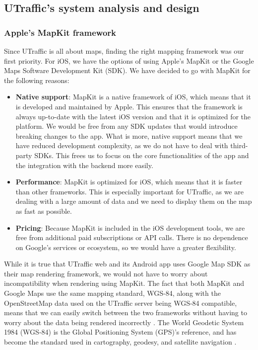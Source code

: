 \subsection{UTraffic's system analysis and design}

\subsubsection{Apple's MapKit framework}

Since UTraffic is all about maps, finding the right mapping framework was our first priority. For iOS, we have the options of using Apple's MapKit or the Google Maps Software Development Kit (SDK). We have decided to go with MapKit for the following reasons:

\begin{itemize}
    \item \textbf{Native support}: MapKit is a native framework of iOS, which means that it is developed and maintained by Apple. This ensures that the framework is always up-to-date with the latest iOS version and that it is optimized for the platform. We would be free from any SDK updates that would introduce breaking changes to the app. What is more, native support means that we have reduced development complexity, as we do not have to deal with third-party SDKs. This frees us to focus on the core functionalities of the app and the integration with the backend more easily.
    \item \textbf{Performance}: MapKit is optimized for iOS, which means that it is faster than other frameworks. This is especially important for UTraffic, as we are dealing with a large amount of data and we need to display them on the map as fast as possible.
    \item \textbf{Pricing}: Because MapKit is included in the iOS development tools, we are free from additional paid subscriptions or API calls. There is no dependence on Google's services or ecosystem, so we would have a greater flexibility.
\end{itemize}

While it is true that UTraffic web and its Android app uses Google Map SDK as their map rendering framework, we would not have to worry about incompatibility when rendering using MapKit. The fact that both MapKit and Google Maps use the same mapping standard, WGS-84, along with the OpenStreetMap data used on the UTraffic server being WGS-84 compatible, means that we can easily switch between the two frameworks without having to worry about the data being rendered incorrectly \cite{cllocationcoordinate2d} \cite{a2019_openstreetmap} \cite{google_map}. The World Geodetic System 1984 (WGS-84) is the Global Positioning System (GPS)'s reference, and has become the standard used in cartography, geodesy, and satellite navigation \cite{gisgeography_2015_world}.

